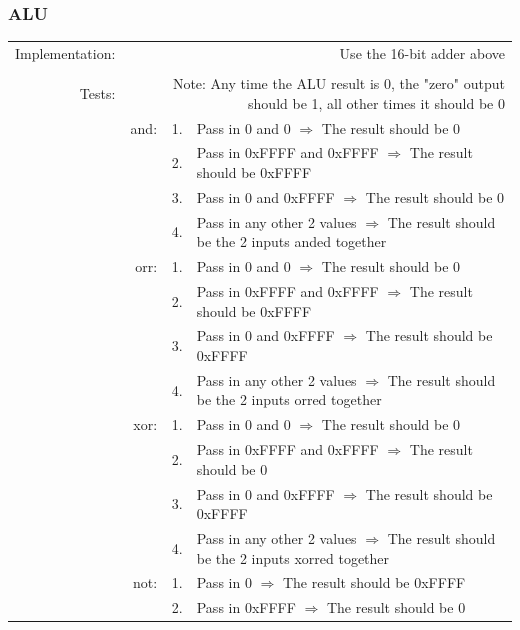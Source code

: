 \documentclass{article}
\begin{document}
		\subsubsection{ALU}
			\begin{longtable}{ r r r p{11cm} }
				Implementation: & \multicolumn{3}{p{12.75cm}}{Use the 16-bit adder above}\\
				                &      &    & \\
				         Tests: & \multicolumn{3}{p{12.75cm}}{Note:  Any time the ALU result is 0, the "zero" output should be 1, all other times it should be 0}\\
				                & and: & 1. & Pass in 0 and 0 $\Rightarrow$ The result should be 0\\
				                &      & 2. & Pass in 0xFFFF and 0xFFFF $\Rightarrow$ The result should be 0xFFFF\\
				                &      & 3. & Pass in 0 and 0xFFFF $\Rightarrow$ The result should be 0\\
				                &      & 4. & Pass in any other 2 values $\Rightarrow$ The result should be the 2 inputs anded together\\
				                & orr: & 1. & Pass in 0 and 0 $\Rightarrow$ The result should be 0\\
				                &      & 2. & Pass in 0xFFFF and 0xFFFF $\Rightarrow$ The result should be 0xFFFF\\
				                &      & 3. & Pass in 0 and 0xFFFF $\Rightarrow$ The result should be 0xFFFF\\
				                &      & 4. & Pass in any other 2 values $\Rightarrow$ The result should be the 2 inputs orred together\\
				                & xor: & 1. & Pass in 0 and 0 $\Rightarrow$ The result should be 0\\
				                &      & 2. & Pass in 0xFFFF and 0xFFFF $\Rightarrow$ The result should be 0\\
				                &      & 3. & Pass in 0 and 0xFFFF $\Rightarrow$ The result should be 0xFFFF\\
				                &      & 4. & Pass in any other 2 values $\Rightarrow$ The result should be the 2 inputs xorred together\\
				                & not: & 1. & Pass in 0 $\Rightarrow$ The result should be 0xFFFF\\
				                &      & 2. & Pass in 0xFFFF $\Rightarrow$ The result should be 0\\

\end{longtable}
\end{document}
